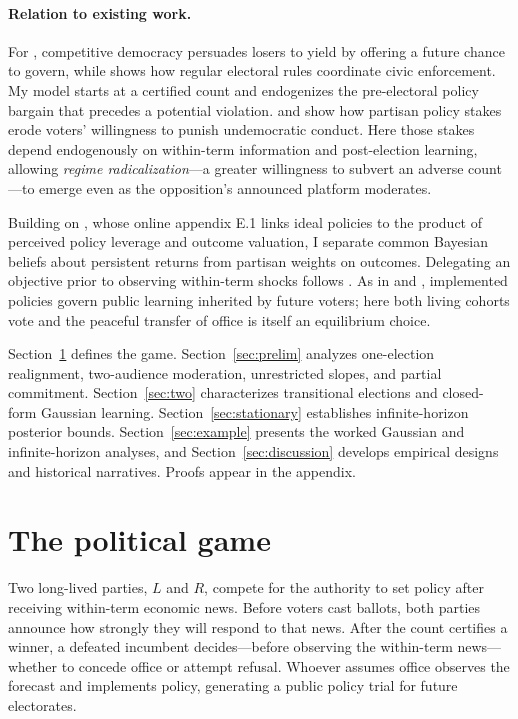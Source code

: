 \documentclass[11pt,letterpaper]{article}
\begin{document}
\begin{enumerate}
\end{enumerate}

\paragraph{Relation to existing work.}
For \citet{przeworski}, competitive democracy persuades losers to yield by offering a future chance to govern, while \citet{fearon} shows how regular electoral rules coordinate civic enforcement. My model starts at a certified count and endogenizes the pre-electoral policy bargain that precedes a potential violation. \citet{svolik2020} and \citet{graham} show how partisan policy stakes erode voters' willingness to punish undemocratic conduct. Here those stakes depend endogenously on within-term information and post-election learning, allowing \emph{regime radicalization}---a greater willingness to subvert an adverse count---to emerge even as the opposition's announced platform moderates.

Building on \citet*{izzo}, whose online appendix E.1 links ideal policies to the product of perceived policy leverage and outcome valuation, I separate common Bayesian beliefs about persistent returns from partisan weights on outcomes. Delegating an objective prior to observing within-term shocks follows \citet{rogoff}. As in \citet{callgood,calltrial} and \citet{partisantraps}, implemented policies govern public learning inherited by future voters; here both living cohorts vote and the peaceful transfer of office is itself an equilibrium choice.

Section~\ref{sec:setup} defines the game. Section~\ref{sec:prelim} analyzes one-election realignment, two-audience moderation, unrestricted slopes, and partial commitment. Section~\ref{sec:two} characterizes transitional elections and closed-form Gaussian learning. Section~\ref{sec:stationary} establishes infinite-horizon posterior bounds. Section~\ref{sec:example} presents the worked Gaussian and infinite-horizon analyses, and Section~\ref{sec:discussion} develops empirical designs and historical narratives. Proofs appear in the appendix.

\section{The political game}\label{sec:setup}

Two long-lived parties, $L$ and $R$, compete for the authority to set policy after receiving within-term economic news. Before voters cast ballots, both parties announce how strongly they will respond to that news. After the count certifies a winner, a defeated incumbent decides---before observing the within-term news---whether to concede office or attempt refusal. Whoever assumes office observes the forecast and implements policy, generating a public policy trial for future electorates.
\end{document}
